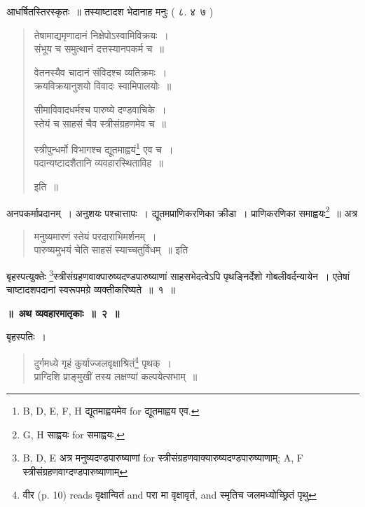 \documentclass[11pt, openany]{book}
\makeatletter
\newcommand{\devanagarinumeral}[1]{
\devanagaridigits{\number \csname c@#1\endcsname}} %
\makeatother
\begin{document}
\fancyhead[RO]{[ $\S$ १}
\fancyhead[LE]{$\S$ १ ]}
\fancyhead[RE,LO]{\thepage}
\cfoot{}
\newpage
\renewcommand{\thepage}{\devanagarinumeral{page}}
\setcounter{page}{2}


आधर्षितस्तिरस्कृतः~॥ तस्याष्टादश भेदानाह मनुः ( ८. ४\textendash\ ७ )

\begin{quote}
{\vy तेषामाद्यमृणादानं निक्षेपोऽस्वामिविक्रयः~।\\
संभूय च समुत्थानं दत्तस्यानपकर्म च~॥

वेतनस्यैव चादानं संविदश्च व्यतिक्रमः~।\\
क्रयविक्रयानुशयो विवादः स्वामिपालयोः~॥

सीमाविवादधर्मश्च पारुष्ये दण्डवाचिके~।\\
स्तेयं च साहसं चैव स्त्रीसंग्रहणमेव च~॥

स्त्रीपुन्धर्मो विभागश्च द्यूतमाह्वयं\renewcommand{\thefootnote}{1}\footnote{B, D, E, F, H द्यूतमाह्वयमेव for द्यूतमाह्वय एव.} एव च~।\\
पदान्यष्टादशैतानि व्यवहारस्थिताविह~॥} इति~॥
\end{quote}

अनपकर्माप्रदानम्~। अनुशयः पश्चात्तापः~। द्यूतमप्राणिकरणिका क्रीडा~। प्राणिकरणिका समाह्वयः\renewcommand{\thefootnote}{2}\footnote{G, H साह्वयः for समाह्वयः,}~॥ अत्र

\begin{quote}
{\vy मनुष्यमारणं स्तेयं परदाराभिमर्शनम्~।\\
पारुष्यमुभयं चेति साहसं स्याच्चतुर्विधम्~॥} इति
\end{quote}

बृहस्पत्युक्तेः \renewcommand{\thefootnote}{3}\footnote{B, D, E अत्र मनुष्यदण्डपारुष्याणां for स्त्रीसंग्रहणवाक्यारुष्यदण्डपारुष्याणाम्; A, F स्त्रीसंग्रहणवाग्दण्डपारुष्याणाम्}स्त्रीसंग्रहणवाक्पारुष्यदण्डपारुष्याणां साहसभेदत्वेऽपि पृथङ्निर्देशो गोबलीवर्दन्यायेन~। एतेषां चाष्टादशपदानां स्वरूपमग्रे व्यक्तीकरिष्यते~॥~१~॥

\begin{center}
\textbf{\Large ॥~अथ व्यवहारमातृकाः~॥~२~॥}
\end{center}

बृहस्पतिः~।

\begin{quote}
{\vy दुर्गमध्ये गृहं कुर्याज्जलवृक्षाश्रितं\renewcommand{\thefootnote}{4}\footnote{वीर (p. 10) reads {\qt वृक्षान्वितं} and परा मा वृक्षावृतं, and स्मृतिच {\qt जलमध्योच्छ्रितं पृथु}} पृथक्~।\\
प्राग्दिशि प्राङ्मुखीं तस्य लक्षण्यां कल्पयेत्सभाम्~॥}
\end{quote}
\end{document}
